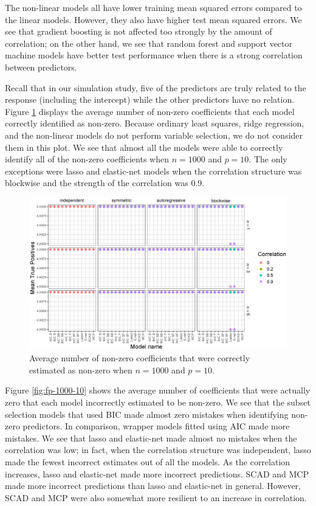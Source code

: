 \documentclass{article}
\begin{document}
The non-linear models all have lower training mean squared errors compared to the linear models. However, they also have higher test mean squared errors. We see that gradient boosting is not affected too strongly by the amount of correlation; on the other hand, we see that random forest and support vector machine models have better test performance when there is a strong correlation between predictors.

Recall that in our simulation study, five of the predictors are truly related to the response (including the intercept) while the other predictors have no relation. Figure \ref{fig:tp-1000-10} displays the average number of non-zero coefficients that each model correctly identified as non-zero. Because ordinary least squares, ridge regression, and the non-linear models do not perform variable selection, we do not consider them in this plot. We see that almost all the models were able to correctly identify all of the non-zero coefficients when $n = 1000$ and $p = 10$. The only exceptions were lasso and elastic-net models when the correlation structure was blockwise and the strength of the correlation was 0.9.

\begin{figure}[h!]
	\centering
	\includegraphics[width = \textwidth]{images/facet-tp/facet_tp_1000_10.eps}
	\caption{Average number of non-zero coefficients that were correctly estimated as non-zero when $n = 1000$ and $p = 10$.}
	\label{fig:tp-1000-10}
\end{figure}

Figure \ref{fig:fp-1000-10} shows the average number of coefficients that were actually zero that each model incorrectly estimated to be non-zero. We see that the subset selection models that used BIC made almost zero mistakes when identifying non-zero predictors. In comparison, wrapper models fitted using AIC made more mistakes. We see that lasso and elastic-net made almost no mistakes when the correlation was low; in fact, when the correlation structure was independent, lasso made the fewest incorrect estimates out of all the models. As the correlation increases, lasso and elastic-net made more incorrect predictions. SCAD and MCP made more incorrect predictions than lasso and elastic-net in general. However, SCAD and MCP were also somewhat more resilient to an increase in correlation.
\end{document}
